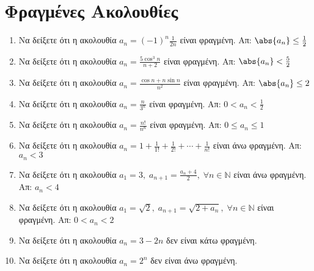 \documentclass[a4paper,table]{report}
\begin{document}
\begin{center}
  \minibox[c]{\large \bfseries \textcolor{Col1}{Ακολουθίες}\\ \large 
  \textcolor{Col1}{Ασκήσεις}}
\end{center}

\vspace{\baselineskip}


\setcounter{chapter}{1}
\section{Φραγμένες Ακολουθίες}

\begin{enumerate}
  \item Να δείξετε ότι η ακολουθία $ a_{n} = (-1)^{n}\frac{1}{2n} $ είναι 
    φραγμένη.
    \hfill Απ: $ \abs{a_{n}} \leq \frac{1}{2} $ 
  \item Να δείξετε ότι η ακολουθία $ a_{n} = \frac{5 \cos^{3}{n}}{n+2} $ 
    είναι φραγμένη.
    \hfill Απ: $ \abs{a_{n}} < \frac{5}{2}  $ 
  \item Να δείξετε ότι η ακολουθία $ a_{n} = \frac{\cos{n} + n \sin{n}}{n^{2}} $ 
    είναι φραγμένη. 
    \hfill Απ: $ \abs{a_{n}} \leq 2 $ 
  \item Να δείξετε ότι η ακολουθία $ a_{n} = \frac{n}{3^{n}} $ είναι 
    φραγμένη. 
    \hfill Απ: $ 0<a_{n}< \frac{1}{2} $
  \item Να δείξετε ότι η ακολουθία $ a_{n} = \frac{n!}{n^{n}} $ είναι 
    φραγμένη. 
    \hfill Απ: $ 0 \leq a_{n} \leq 1 $ 
  \item Να δείξετε ότι η ακολουθία $ a_{n} = 1 + \frac{1}{1!} +
    \frac{1}{2!} + \cdots + \frac{1}{n!} $ είναι άνω φραγμένη.
    \hfill Απ: $ a_{n} < 3 $ 
  \item Να δείξετε ότι η ακολουθία $ a_{1} = 3, \; a_{n+1} =
    \frac{a_{n}+4}{2}, \; \forall n \in \mathbb{N} $ είναι άνω φραγμένη.
    \hfill Απ: $ a_{n} < 4 $ 
  \item Να δείξετε ότι η ακολουθία $ a_{1} = \sqrt{2}, \; a_{n+1} =
    \sqrt{2+ a_{n}}, \; \forall n \in \mathbb{N} $ είναι φραγμένη.
    \hfill Απ: $ 0 < a_{n} < 2$ 
  \item Να δείξετε ότι η ακολουθία $ a_{n} = 3-2n $ δεν είναι κάτω φραγμένη. 
  \item Να δείξετε ότι η ακολουθία $ a_{n} = 2^{n} $ δεν είναι άνω 
    φραγμένη.
\end{enumerate}
\end{document}
